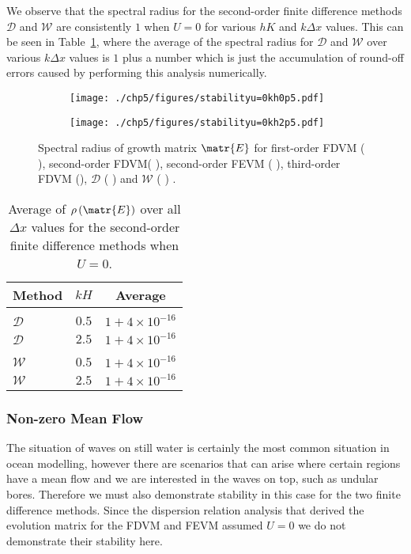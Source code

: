 We observe that the spectral radius for the second-order finite difference methods $\mathcal{D}$ and $\mathcal{W}$ are consistently $1$ when $U=0$ for various $hK$ and $
k\Delta x$ values. This can be seen in Table~\ref{tab:Averageofspectralradiusu=0}, where the average of the spectral radius for $\mathcal{D}$ and $\mathcal{W}$ over various $k \Delta x$ values is $1$ plus a number which is just the accumulation of round-off errors caused by performing this analysis numerically.
%
\begin{figure}
	\centering
	\begin{subfigure}{0.5\textwidth}
		\texttt{[image: ./chp5/figures/stabilityu=0kh0p5.pdf]}
	\end{subfigure}%
	\begin{subfigure}{0.5\textwidth}
		\texttt{[image: ./chp5/figures/stabilityu=0kh2p5.pdf]}
	\end{subfigure}
	\caption{Spectral radius of growth matrix $\matr{E}$ for first-order FDVM ({\color{green!60!black} \solidrule}), second-order FDVM({\color{red} \solidrule}), second-order FEVM ({\color{blue} \solidrule}), third-order FDVM ({\solidrule}), $\mathcal{D}$ ({\color{violet!80!white} \solidrule}) and $\mathcal{W}$ ({\color{orange} \solidrule}) .}
	\label{fig:Stabu=0}
\end{figure}
%
\begin{table}
	\centering
	\begin{tabular}{l  c  c}
		Method & $kH$& Average\\
		\hline && \\
		$\mathcal{D}$& $0.5$ & $1+ 4\times 10^{-16}$  \\
		$\mathcal{D}$& $2.5$ & $1+ 4\times 10^{-16}$  \\
		\hline \\
		$\mathcal{W}$& $0.5$ & $1+ 4\times 10^{-16}$  \\
		$\mathcal{W}$& $2.5$ & $1+ 4\times 10^{-16}$ 
	\end{tabular}
	\caption{Average of $\rho\left(\matr{E}\right)$ over all $\Delta x$ values for the second-order finite difference methods when $U=0$.}
	\label{tab:Averageofspectralradiusu=0}
\end{table}
\subsubsection{Non-zero Mean Flow} 
The situation of waves on still water is certainly the most common situation in ocean modelling, however there are scenarios that can arise where certain regions have a mean flow and we are interested in the waves on top, such as undular bores. Therefore we must also demonstrate stability in this case for the two finite difference methods. Since the dispersion relation analysis that derived the evolution matrix for the FDVM and FEVM assumed $U=0$ we do not demonstrate their stability here. 

